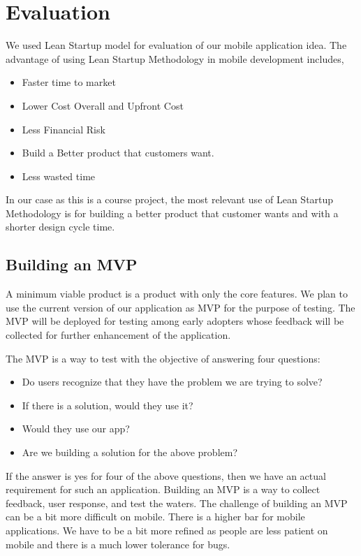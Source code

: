 


\section{Evaluation}

We used Lean Startup \cite{LeanStartup} model for evaluation of our mobile application idea. The advantage of using Lean Startup Methodology in mobile development includes,
\begin{itemize}
	\item Faster time to market
	\item Lower Cost Overall and Upfront Cost
	\item Less Financial Risk
	\item Build a Better product that customers want.
	\item Less wasted time
\end{itemize}

In our case as this is a course project, the most relevant use of Lean Startup Methodology is for building a better product that customer wants and with a shorter design cycle time.

\subsection{Building an MVP}
A minimum viable product \cite{MVP} is a product with only the core features. We plan to use the current version of  our application as MVP for the purpose of testing. The MVP will be deployed for testing among early adopters whose feedback will be collected for further enhancement of the application.

The MVP is a way to test with the objective of answering four questions:
\begin{itemize}
	\item Do users recognize that they have the problem we are trying to solve?
	\item If there is a solution, would they use it?
	\item Would they use our app?
	\item Are we building a solution for the above problem?
\end{itemize}

If the answer is yes for four of the above questions, then we have an actual requirement for such an application. Building an MVP is a way to collect feedback, user response, and test the waters. The challenge of building an MVP can be a bit more difficult on mobile. There is a higher bar for mobile applications. We have to be a bit more refined as people are less patient on mobile and there is a much lower tolerance for bugs.


